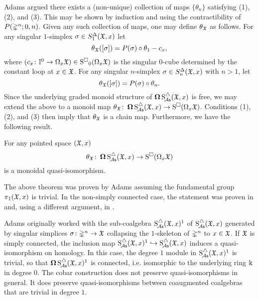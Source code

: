 Adams argued there exists a (non-unique) collection of maps $\{\theta_n\}$ satisfying (1), (2), and (3). This may be shown by induction and using the contractibility of $P(\mathbb{\Delta}^n; 0,n)$. Given any such collection of maps, one may define $\theta_{\mathfrak{X}}$ as follows. For any singular $1$-simplex $\sigma \in S^{\Delta}_1(\mathfrak{X},x)$ let
\[
\theta_{\mathfrak{X}}([\sigma]) = P(\sigma) \circ \theta_1 - c_x,
\]
where $(c_x \colon \mathbb{I}^0 \to \Omega_x\mathfrak{X}) \in \operatorname{S^{\square}}_0(\Omega_x \mathfrak{X})$ is the singular $0$-cube determined by the constant loop at $x \in \mathfrak{X}$.
For any singular $n$-simplex $\sigma \in S^{\Delta}_n(\mathfrak{X},x)$ with $n>1$, let
\[
\theta_{\mathfrak{X}}([\sigma]) = P(\sigma) \circ \theta_n.
\]
Since the underlying graded monoid structure of $\operatorname{\mathbf{\Omega}} \operatorname{S^{\triangle}_{\!{\mathcal{A}\mathsf{s}}}}(\mathfrak{X},x)$ is free, we may extend the above to a monoid map $\theta_{\mathfrak{X}} \colon \operatorname{\mathbf{\Omega}} \operatorname{S^{\triangle}_{\!{\mathcal{A}\mathsf{s}}}}(\mathfrak{X},x) \to \operatorname{S^{\square}}(\Omega_x \mathfrak{X})$.
Conditions (1), (2), and (3) then imply that $\theta_{\mathfrak{X}}$ is a chain map.
Furthermore, we have the following result.

\begin{proposition}
    For any pointed space $(\mathfrak{X},x)$
    \[
    \theta_{\mathfrak{X}} \colon \operatorname{\mathbf{\Omega}} \operatorname{S^{\triangle}_{\!{\mathcal{A}\mathsf{s}}}}(\mathfrak{X},x) \to \operatorname{S^{\square}}(\Omega_x \mathfrak{X})
    \]
    is a monoidal quasi-isomorphism. 
\end{proposition}

The above theorem was proven by Adams assuming the fundamental group $\pi_1(\mathfrak{X},x)$ is trivial. In the non-simply connected case, the statement was proven in \cite{rivera2018rigidification} and, using a different argument, in \cite{rivera2019path}. 

\begin{remark}
    Adams originally worked with the sub-coalgebra $\operatorname{S^{\triangle}_{\!{\mathcal{A}\mathsf{s}}}}(\mathfrak{X},x)^1$ of $\operatorname{S^{\triangle}_{\!{\mathcal{A}\mathsf{s}}}}(\mathfrak{X},x)$ generated by singular simplices $\sigma \colon \mathbb{\Delta}^n \to \mathfrak{X}$ collapsing the $1$-skeleton of $\mathbb{\Delta}^n$ to $x \in \mathfrak{X}$. If $\mathfrak{X}$ is simply connected, the inclusion map $\operatorname{S^{\triangle}_{\!{\mathcal{A}\mathsf{s}}}}(\mathfrak{X},x)^1  \hookrightarrow \operatorname{S^{\triangle}_{\!{\mathcal{A}\mathsf{s}}}}(\mathfrak{X},x)$ induces a quasi-isomorphism on homology. In this case, the degree $1$ module in $\operatorname{S^{\triangle}_{\!{\mathcal{A}\mathsf{s}}}}(\mathfrak{X},x)^1$ is trivial, so that $\operatorname{\mathbf{\Omega}} \operatorname{S^{\triangle}_{\!{\mathcal{A}\mathsf{s}}}}(\mathfrak{X},x)^1$ is connected, i.e. isomorphic to the underlying ring $\Bbbk$ in degree $0$. The cobar construction does not preserve quasi-isomorphisms in general. It does preserve quasi-isomorphisms between coaugmented coalgebras that are trivial in degree $1$.
\end{remark}


